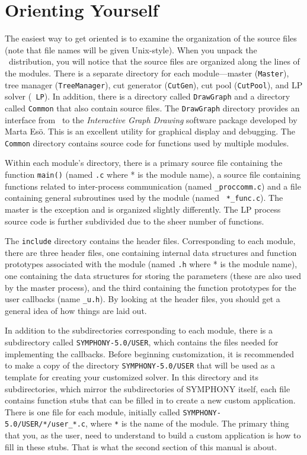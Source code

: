\section{Orienting Yourself}

The easiest way to get oriented is to examine the organization of the source
files (note that file names will be given Unix-style). When you unpack the
\BB\ distribution, you will notice that the source files are organized along
the lines of the modules.  There is a separate directory for each
module---master ({\tt Master}), tree manager ({\tt TreeManager}), cut
generator ({\tt CutGen}), cut pool ({\tt CutPool}), and LP solver ({\tt
LP}). In addition, there is a directory called {\tt DrawGraph} and a directory
called {\tt Common} that also contain source files. The {\tt DrawGraph}
directory provides an interface from \BB\ to the {\em Interactive Graph
Drawing} software package developed by Marta Es\"o. This is an excellent
utility for graphical display and debugging. The {\tt Common} directory
contains source code for functions used by multiple modules.

Within each module's directory, there is a primary source file
containing the function {\tt main()} (named {\tt *.c} where * is the
module name), a source file containing functions related to
inter-process communication (named {\tt *\_proccomm.c}) and a file
containing general subroutines used by the module (named {\tt
*\_func.c}). The master is the exception and is organized slightly
differently. The LP process source code is further subdivided due to
the sheer number of functions.

The {\tt include} directory contains the header files. Corresponding
to each module, there are three header files, one containing internal
data structures and function prototypes associated with the module
(named {\tt *.h} where * is the module name), one containing the data
structures for storing the parameters (these are also used by the
master process), and the third containing the function prototypes for
the user callbacks (name {\tt *\_u.h}). By looking at the header files, you
should get a general idea of how things are laid out.

In addition to the subdirectories corresponding to each module, there is a
subdirectory called \texttt{SYMPHONY-5.0/USER}, which contains the files
needed for implementing the callbacks. Before beginning
customization, it is recommended to make a copy of the directory
\texttt{SYMPHONY-5.0/USER} that will be used as a template for creating your
customized solver. In this directory and its subdirectories, which mirror the
subdirectories of SYMPHONY itself, each file contains function stubs that can
be filled in to create a new custom application. There is one file for each
module, initially called \texttt{SYMPHONY-5.0/USER/*/user\_*.c}, where
\texttt{*} is the name of the module. The primary thing that you, as the user,
need to understand to build a custom application is how to fill in these
stubs. That is what the second section of this manual is about.

